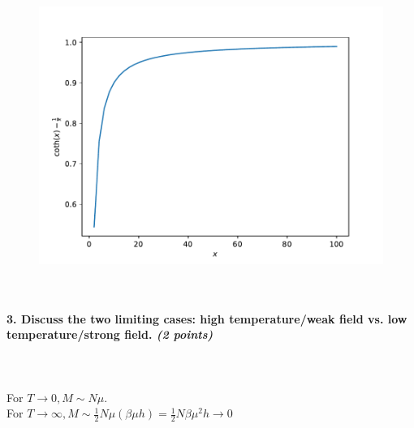     \begin{figure}[h!]
        \centering
        \includegraphics[width=.6\textwidth]{./figures/magnetization.pdf}
    \end{figure} \ \\ 

\paragraph{3. Discuss the two limiting cases: 
    high temperature/weak field vs. 
    low temperature/strong field.
    \textit{(2 points)}
} \ \\
    \\
    For $T\to0, M\sim N\mu$. \\
    For $T\to\infty, M\sim\frac{1}{2}N\mu(\beta\mu h)=\frac{1}{2}N\beta\mu^2 h\to0$
